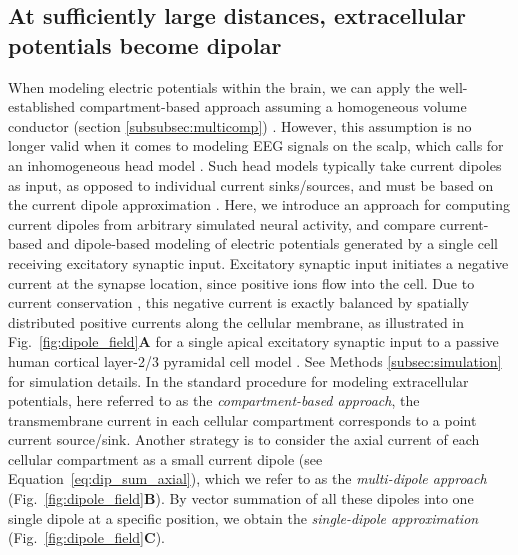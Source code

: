\documentclass[preprint,10pt,authoryear]{elsarticle}
\begin{document}
\subsection{At sufficiently large distances, extracellular potentials become dipolar}\label{subsec:cb_db_comp_inf}

When modeling electric potentials within the brain, we can apply the well-established compartment-based approach assuming a homogeneous volume conductor (section \ref{subsubsec:multicomp}) \citep{EINEVOLL2013REVIEW,HOLT1999}.
However, this assumption is no longer valid when it comes to modeling EEG signals on the scalp, which calls for an inhomogeneous head model \citep{Ilmoniemi2019}. Such head models typically take current dipoles as input, as opposed to individual current sinks/sources, and must be based on the current dipole approximation \citep{NUNEZ2006}. Here, we introduce an approach for computing current dipoles from arbitrary simulated neural activity, and compare current-based and dipole-based modeling of electric potentials generated by a single cell receiving excitatory synaptic input.
Excitatory synaptic input initiates a negative current at the synapse location, since positive ions flow into the cell. Due to current conservation \citep{Koch1999}, this negative current is exactly balanced by spatially distributed positive currents along the cellular membrane, as illustrated in Fig.~\ref{fig:dipole_field}\textbf{A} for a single apical excitatory synaptic input to a passive human cortical layer-2/3 pyramidal cell model \citep{EYAL2016}. See Methods \ref{subsec:simulation} for simulation details.
In the standard procedure for modeling extracellular potentials, here referred to as the {\it compartment-based approach}, the transmembrane current in each cellular compartment corresponds to a point current source/sink. Another strategy is to consider the axial current of each cellular compartment as a small current dipole (see Equation~\eqref{eq:dip_sum_axial}), which we refer to as the {\it multi-dipole approach} (Fig.~\ref{fig:dipole_field}\textbf{B}). By vector summation of all these dipoles into one single dipole at a specific position, we obtain the {\it single-dipole approximation} (Fig.~\ref{fig:dipole_field}\textbf{C}).
\end{document}
